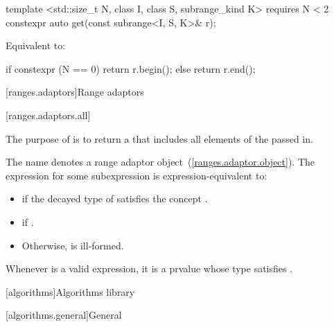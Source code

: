 %
\begin{itemdecl}
template <std::size_t N, class I, class S, subrange_kind K>
  requires N < 2
constexpr auto get(const subrange<I, S, K>& r);
\end{itemdecl}

\begin{itemdescr}
\pnum
\effects Equivalent to:
\begin{codeblock}
if constexpr (N == 0)
  return r.begin();
else
  return r.end();
\end{codeblock}
\end{itemdescr}

[ranges.adaptors]{Range adaptors}

\setcounter{subsection}{3}
[ranges.adaptors.all]{}

\pnum
The purpose of  is to return a  that includes all
elements of the  passed in.

\pnum
The name  denotes a range adaptor
object~(\ref{ranges.adaptor.object}). The
expression  for some subexpression  is
expression-equivalent to:

\begin{itemize}
\item {} if the decayed type of 
satisfies the concept .
\item {} if .
\item Otherwise,  is ill-formed.
\end{itemize}

\remark Whenever  is a valid expression, it is a prvalue
whose type satisfies .

[algorithms]{Algorithms library}


[algorithms.general]{General}


